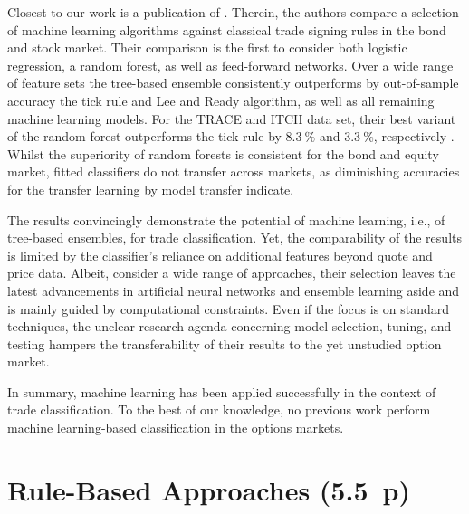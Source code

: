 Closest to our work is a publication of \textcite[\pno~1f.]{ronenMachineLearningTrade2022}. Therein, the authors compare a selection of machine learning algorithms against classical trade signing rules in the bond and stock market. Their comparison is the first to consider both logistic regression, a random forest, as well as feed-forward networks. Over a wide range of feature sets the tree-based ensemble consistently outperforms by out-of-sample accuracy the tick rule and Lee and Ready algorithm, as well as all remaining machine learning models. For the TRACE and ITCH data set, their best variant of the random forest outperforms the tick rule by $8.3~\%$ and $3.3~\%$, respectively \autocite[\pno~57]{ronenMachineLearningTrade2022}. Whilst the superiority of random forests is consistent for the bond and equity market, fitted classifiers do not transfer across markets, as diminishing accuracies for the transfer learning by model transfer indicate.

The results convincingly demonstrate the potential of machine learning, i.e., of tree-based ensembles, for trade classification. Yet, the comparability of the results is limited by the classifier's reliance on additional features beyond quote and price data. Albeit, \textcite[\pno~4]{ronenMachineLearningTrade2022} consider a wide range of approaches, their selection leaves the latest advancements in artificial neural networks and ensemble learning aside and is mainly guided by computational constraints. Even if the focus is on standard techniques, the unclear research agenda concerning model selection, tuning, and testing hampers the transferability of their results to the yet unstudied option market.

In summary, machine learning has been applied successfully in the context of trade classification. To the best of our knowledge, no previous work perform machine learning-based classification in the options markets.

\newpage
\section{Rule-Based Approaches (5.5~p)}\label{sec:rule-based-approaches}




